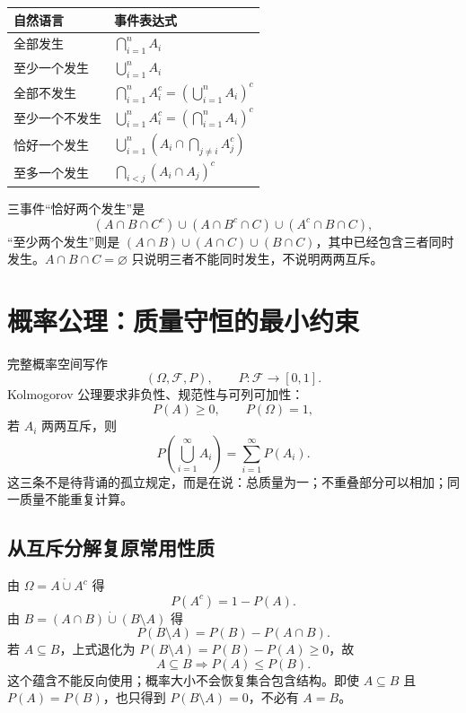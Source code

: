 \documentclass[11pt,a4paper]{ctexart}
\begin{document}
\begin{center}
\begin{tabularx}{\linewidth}{L{3.2cm}Y}
\toprule
自然语言 & 事件表达式 \\
\midrule
全部发生 & $\displaystyle\bigcap_{i=1}^{n}A_i$ \\
至少一个发生 & $\displaystyle\bigcup_{i=1}^{n}A_i$ \\
全部不发生 & $\displaystyle\bigcap_{i=1}^{n}A_i^c=\left(\bigcup_{i=1}^{n}A_i\right)^c$ \\
至少一个不发生 & $\displaystyle\bigcup_{i=1}^{n}A_i^c=\left(\bigcap_{i=1}^{n}A_i\right)^c$ \\
恰好一个发生 & $\displaystyle\bigcup_{i=1}^{n}\left(A_i\cap\bigcap_{j\ne i}A_j^c\right)$ \\
至多一个发生 & $\displaystyle\bigcap_{i<j}(A_i\cap A_j)^c$ \\
\bottomrule
\end{tabularx}
\end{center}

三事件“恰好两个发生”是
\[
(A\cap B\cap C^c)\cup(A\cap B^c\cap C)\cup(A^c\cap B\cap C),
\]
“至少两个发生”则是 $(A\cap B)\cup(A\cap C)\cup(B\cap C)$，其中已经包含三者同时发生。$A\cap B\cap C=\varnothing$ 只说明三者不能同时发生，不说明两两互斥。

\section{概率公理：质量守恒的最小约束}

完整概率空间写作
\[
(\Omega,\mathcal F,P),\qquad P:\mathcal F\to[0,1].
\]
Kolmogorov 公理要求非负性、规范性与可列可加性：
\[
P(A)\ge0,\qquad P(\Omega)=1,
\]
若 $A_i$ 两两互斥，则
\[
P\!\left(\bigcup_{i=1}^{\infty}A_i\right)=\sum_{i=1}^{\infty}P(A_i).
\]
这三条不是待背诵的孤立规定，而是在说：总质量为一；不重叠部分可以相加；同一质量不能重复计算。

\subsection{从互斥分解复原常用性质}

由 $\Omega=A\mathbin{\dot\cup}A^c$ 得
\[
P(A^c)=1-P(A).
\]
由 $B=(A\cap B)\mathbin{\dot\cup}(B\setminus A)$ 得
\[
P(B\setminus A)=P(B)-P(A\cap B).
\]
若 $A\subseteq B$，上式退化为 $P(B\setminus A)=P(B)-P(A)\ge0$，故
\[
A\subseteq B\Longrightarrow P(A)\le P(B).
\]
这个蕴含不能反向使用；概率大小不会恢复集合包含结构。即使 $A\subseteq B$ 且 $P(A)=P(B)$，也只得到 $P(B\setminus A)=0$，不必有 $A=B$。
\end{document}
